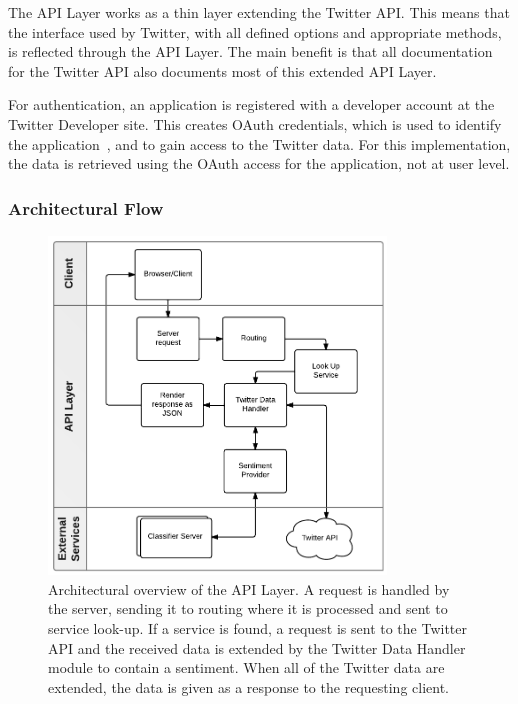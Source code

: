 The API Layer works as a thin layer extending the Twitter API. This means that the interface used by Twitter, with all defined options and appropriate methods, is reflected through the API Layer. The main benefit is that all documentation for the Twitter API also documents most of this extended API Layer.

For authentication, an application is registered with a developer account at the Twitter Developer site. This creates OAuth credentials, which is used to identify the application~\citep{site:oauth}, and to gain access to the Twitter data. For this implementation, the data is retrieved using the OAuth access for the application, not at user level. 

\subsubsection{Architectural Flow}

\begin{figure}[!ht]
 \begin{center}
     \includegraphics[width=0.8\textwidth]{../img/APILayerArcitechture.pdf}
 \end{center}
 \caption[Architectural overview of the API Layer.]{Architectural overview of the API Layer. A request is handled by the server, sending it to routing where it is processed and sent to service look-up. If a service is found, a request is sent to the Twitter API and the received data is extended by the Twitter Data Handler module to contain a sentiment. When all of the Twitter data are extended, the data is given as a response to the requesting client.}
 \label{fig:APILayerArcitechture.pdf}
\end{figure}

